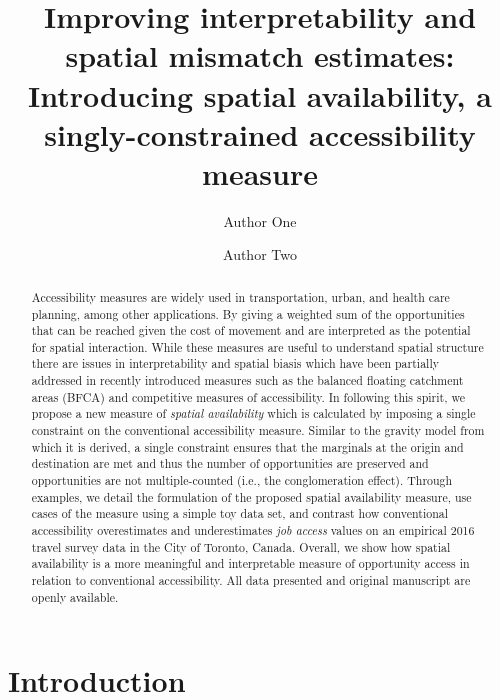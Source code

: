 \documentclass[]{elsarticle} %
\begin{document}
\begin{frontmatter}

  \title{Improving interpretability and spatial mismatch estimates:
Introducing spatial availability, a singly-constrained accessibility
measure}
    \author[Some School]{Author One}
    \author[Some School]{Author Two}
      \address[Some School]{Address}
  
  \begin{abstract}
  Accessibility measures are widely used in transportation, urban, and
  health care planning, among other applications. By giving a weighted
  sum of the opportunities that can be reached given the cost of
  movement and are interpreted as the potential for spatial interaction.
  While these measures are useful to understand spatial structure there
  are issues in interpretability and spatial biasis which have been
  partially addressed in recently introduced measures such as the
  balanced floating catchment areas (BFCA) and competitive measures of
  accessibility. In following this spirit, we propose a new measure of
  \emph{spatial availability} which is calculated by imposing a single
  constraint on the conventional accessibility measure. Similar to the
  gravity model from which it is derived, a single constraint ensures
  that the marginals at the origin and destination are met and thus the
  number of opportunities are preserved and opportunities are not
  multiple-counted (i.e., the conglomeration effect). Through examples,
  we detail the formulation of the proposed spatial availability
  measure, use cases of the measure using a simple toy data set, and
  contrast how conventional accessibility overestimates and
  underestimates \emph{job access} values on an empirical 2016 travel
  survey data in the City of Toronto, Canada. Overall, we show how
  spatial availability is a more meaningful and interpretable measure of
  opportunity access in relation to conventional accessibility. All data
  presented and original manuscript are openly available.
  \end{abstract}
  
 \end{frontmatter}

\newpage

\hypertarget{introduction}{%
\section{Introduction}\label{introduction}}
\end{document}
